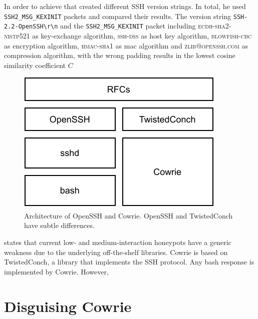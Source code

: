 In order to achieve that \citet{vetterl2020} created different SSH version strings.
In total, he used 
\verb|SSH2_MSG_KEXINIT| packets and compared their results.
The version string \verb|SSH-2.2-OpenSSH\r\n| and the \verb|SSH2_MSG_KEXINIT| packet including \textsc{ecdh-sha2-nistp521} as key-exchange algorithm, \textsc{ssh-dss} as host key algorithm, \textsc{blowfish-cbc} as encryption algorithm, \textsc{hmac-sha1} as mac algorithm and \textsc{zlib@openssh.com} as compression algorithm, with the wrong padding results in the lowest cosine similarity coefficient $C$

\begin{figure}[ht]
    \centering
    \includegraphics{figures/cowrie-openssh.pdf}
    \caption[Architecture of OpenSSH and Cowrie]{Architecture of OpenSSH and Cowrie. OpenSSH and TwistedConch have subtle differences.}
    \label{fig:cowrie-openssh}
\end{figure}

\citet{vetterl2020} states that current low- and medium-interaction honeypots have a generic weakness due to the underlying off-the-shelf libraries.
Cowrie is based on TwistedConch, a library that implements the SSH protocol.
Any bash response is implemented by Cowrie.
However, 

\section{Disguising Cowrie}

